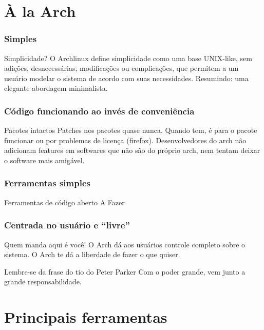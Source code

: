 \documentclass{beamer}
\begin{document}
\section{À la Arch}

\begin{frame}
    \frametitle{Simples}
    \begin{block}{Simplicidade?}
        O Archlinux define simplicidade como uma base UNIX-like, sem adições,
        desnecessárias, modificações ou complicações, que permitem a um usuário modelar o sistema de acordo com suas 
        necessidades. Resumindo: uma elegante abordagem minimalista.
    \end{block}
\end{frame}


\begin{frame}
    \frametitle{Código funcionando ao invés de conveniência} 
    \begin{block}{Pacotes intactos}
        Patches nos pacotes quase nunca. Quando tem, é para o pacote funcionar ou por problemas de licença (firefox). Desenvolvedores do 
        arch não adicionam features em softwares que não são do próprio arch, nem tentam deixar o software mais amigável.
    \end{block}
\end{frame}

\begin{frame}
    \frametitle{Ferramentas simples}
    \begin{block}{Ferramentas de código aberto}
        A Fazer
    \end{block}
\end{frame}

\begin{frame}
    \frametitle{Centrada no usuário e ``livre''}
    \begin{block}{Quem manda aqui é você!}
        O Arch dá aos usuários controle completo sobre o sistema. O Arch te dá a liberdade de fazer o que quiser.
    \end{block}
    \begin{block}{Lembre-se da frase do tio do Peter Parker}
        Com o poder grande, vem junto a grande responsabilidade.
    \end{block}
\end{frame}



\section{Principais ferramentas}
\end{document}
